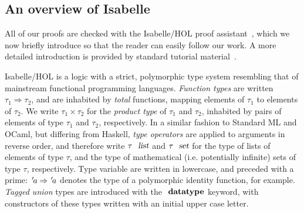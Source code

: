 \documentclass[acmlarge,review,anonymous]{acmart}\settopmatter{printfolios=true}
\begin{document}







\subsection{An overview of Isabelle}
\label{subsect.an.overview.of.isabelle}

All of our proofs are checked with the Isabelle/HOL proof assistant~\cite{DBLP:conf/tphol/WenzelPN08}, which we now briefly introduce so that the reader can easily follow our work.
A more detailed introduction is provided by standard tutorial material~\cite{DBLP:books/sp/NipkowK14}.

Isabelle/HOL is a logic with a strict, polymorphic type system resembling that of mainstream functional programming languages.
\emph{Function types} are written $\tau_1 \Rightarrow \tau_2$, and are inhabited by \emph{total} functions, mapping elements of $\tau_1$ to elements of $\tau_2$.
We write $\tau_1 \times \tau_2$ for the \emph{product type} of $\tau_1$ and $\tau_2$, inhabited by pairs of elements of type $\tau_1$ and $\tau_2$, respectively.
In a similar fashion to Standard ML and OCaml, but differing from Haskell, \emph{type operators} are applied to arguments in reverse order, and therefore write $\tau\ \isa{list}$ and $\tau\ \isa{set}$ for the type of lists of elements of type $\tau$, and the type of mathematical (i.e. potentially infinite) sets of type $\tau$, respectively.
Type variable are written in lowercase, and preceded with a prime: ${\emph{$\mskip2mu{'}\mskip-2mu$}}a \Rightarrow {\emph{$\mskip2mu{'}\mskip-2mu$}}a$ denotes the type of a polymorphic identity function, for example.
\emph{Tagged union} types are introduced with the $\isacommand{datatype}$ keyword, with constructors of these types written with an initial upper case letter.
\end{document}
